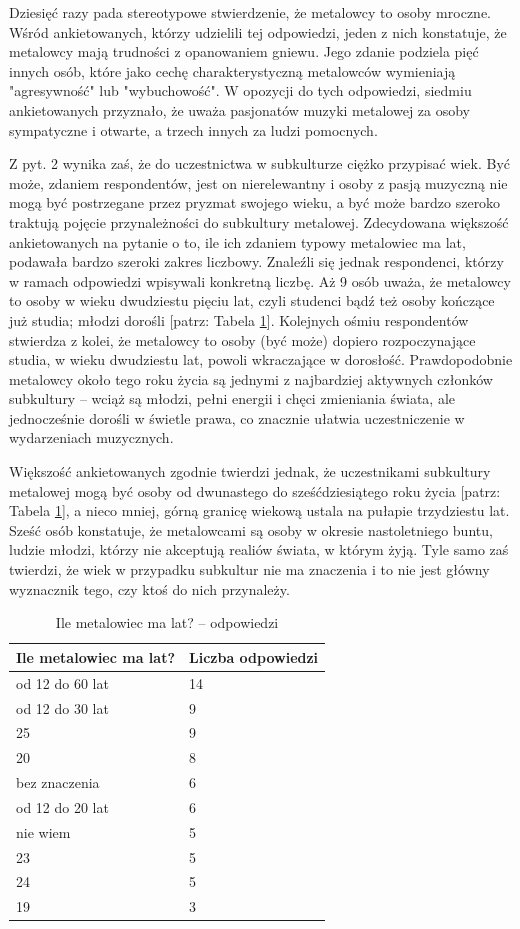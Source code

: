 \documentclass[12pt, a4paper, titlepage]{report}
\begin{document}
Dziesięć razy pada stereotypowe stwierdzenie, że metalowcy to osoby mroczne. Wśród ankietowanych, którzy udzielili tej odpowiedzi, jeden z nich konstatuje, że metalowcy mają trudności z opanowaniem gniewu. Jego zdanie podziela pięć innych osób, które jako cechę charakterystyczną metalowców wymieniają "agresywność" lub "wybuchowość". W opozycji do tych odpowiedzi, siedmiu ankietowanych przyznało, że uważa pasjonatów muzyki metalowej za osoby sympatyczne i otwarte, a trzech innych za ludzi pomocnych. 

Z pyt. 2 wynika zaś, że do uczestnictwa w subkulturze ciężko przypisać wiek. Być może, zdaniem respondentów, jest on nierelewantny i osoby z pasją muzyczną nie mogą być postrzegane przez pryzmat swojego wieku, a być może bardzo szeroko traktują pojęcie przynależności do subkultury metalowej. Zdecydowana większość ankietowanych na pytanie o to, ile ich zdaniem typowy metalowiec ma lat, podawała bardzo szeroki zakres liczbowy. Znaleźli się jednak respondenci, którzy w ramach odpowiedzi wpisywali konkretną liczbę. Aż 9 osób uważa, że metalowcy to osoby w wieku dwudziestu pięciu lat, czyli studenci bądź też osoby kończące już studia; młodzi dorośli [patrz: Tabela \ref{table:x}]. Kolejnych ośmiu respondentów stwierdza z kolei, że metalowcy to osoby (być może) dopiero rozpoczynające studia, w wieku dwudziestu lat, powoli wkraczające w dorosłość. Prawdopodobnie metalowcy około tego roku życia są jednymi z najbardziej aktywnych członków subkultury -- wciąż są młodzi, pełni energii i chęci zmieniania świata, ale jednocześnie dorośli w świetle prawa, co znacznie ułatwia uczestniczenie w wydarzeniach muzycznych.

Większość ankietowanych zgodnie twierdzi jednak, że uczestnikami subkultury metalowej mogą być osoby od dwunastego do sześćdziesiątego roku życia [patrz: Tabela \ref{table:x}], a nieco mniej, górną granicę wiekową ustala na pułapie trzydziestu lat. Sześć osób konstatuje, że metalowcami są osoby w okresie nastoletniego buntu, ludzie młodzi, którzy nie akceptują realiów świata, w którym żyją. Tyle samo zaś twierdzi, że wiek w przypadku subkultur nie ma znaczenia i to nie jest główny wyznacznik tego, czy ktoś do nich przynależy. 

\begin{table}[!htb]
\begin{tabular}{ m{23em} | m{5em} } 
\textbf{Ile metalowiec ma lat?} & Liczba odpowiedzi \\
\hline
od 12 do 60 lat & 14 \\
od 12 do 30 lat & 9 \\ 
25 & 9 \\
20 & 8 \\
bez znaczenia & 6 \\
od 12 do 20 lat & 6 \\
nie wiem & 5 \\
23 & 5 \\
24 & 5 \\
19 & 3 \\
\end{tabular} 
\caption{Ile metalowiec ma lat? -- odpowiedzi}
\label{table:x}
\end{table}
\end{document}
